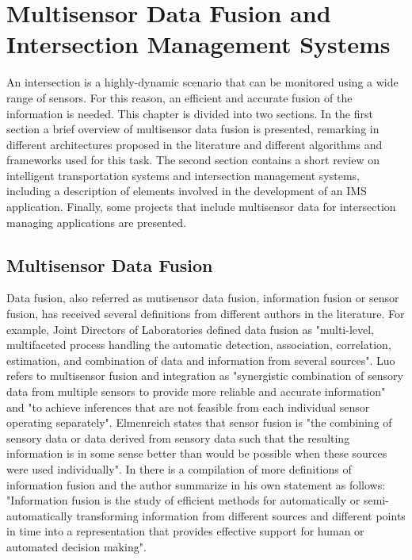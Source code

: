 %

\chapter [Multisensor Data Fusion and Intersection Management Systems]{Multisensor Data Fusion and Intersection Management Systems}

An intersection is a highly-dynamic scenario that can be monitored using a wide range of sensors. For this reason, an efficient and accurate fusion of the information is needed. This chapter is divided into two sections. In the first section a brief overview of multisensor data fusion is presented, remarking in different architectures proposed in the literature and different algorithms and frameworks used for this task. The second section contains a short review on intelligent transportation systems and intersection management systems, including a description of elements involved in the development of an IMS application. Finally, some projects that include multisensor data for intersection managing applications are presented.

\section{Multisensor Data Fusion}

Data fusion, also referred as mutisensor data fusion, information fusion or sensor fusion, has received several definitions from different authors in the literature. For example, Joint Directors of Laboratories defined data fusion as "multi-level, multifaceted process handling the automatic detection, association, correlation, estimation, and combination of data and information from several sources"\cite{White1991}. Luo refers to multisensor fusion and integration as "synergistic combination of sensory data from multiple sensors to provide more reliable and accurate information"\cite{Luo2002} and "to achieve inferences that are not feasible from each individual sensor operating separately"\cite{Luo2011}. Elmenreich states that sensor fusion is "the combining of sensory data or data derived from sensory data such that the resulting information is in some sense better than would be possible when these sources were used individually"\cite{Elmenreich2007}. In \cite{Bostrom2007} there is a compilation of more definitions of information fusion and the author summarize in his own statement as follows: "Information fusion is the study of efficient methods for automatically or semi-automatically transforming information from different sources and different points in time into a representation that provides effective support for human or automated decision making".  

